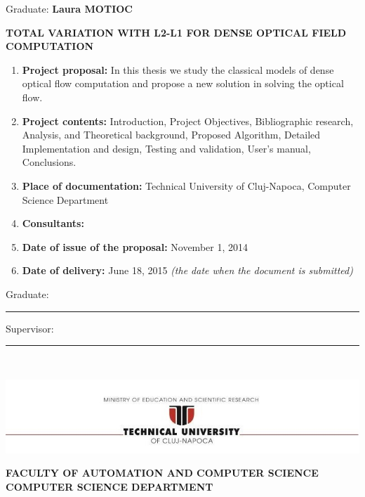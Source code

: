 \documentclass[12pt,a4paper,twoside]{report}
\renewcommand{\thesisauthor}{Laura MOTIOC}    %
\renewcommand{\thesistitle}{TOTAL VARIATION WITH L2-L1 FOR DENSE OPTICAL FIELD COMPUTATION}
\newcommand{\department}{\bf FACULTY OF AUTOMATION AND COMPUTER SCIENCE\\
COMPUTER SCIENCE DEPARTMENT}
\newcommand{\utcnlogo}{\includegraphics[width=15cm]{img/tucn.jpg}}
\newcommand{\uline}[1]{\rule[0pt]{#1}{0.4pt}}
\begin{document}
\vspace{2cm}

\begin{center}
Graduate: {\bf \thesisauthor}

\vspace{1cm}

{\bf \thesistitle}
\end{center}

\vspace{1cm}

\begin{enumerate}
 \item {\bf Project proposal:} In this thesis we study the classical models of dense optical flow computation and propose a new solution in solving the optical flow.
\item {\bf Project contents:} Introduction, Project Objectives, Bibliographic research, Analysis, and Theoretical background, Proposed Algorithm, Detailed Implementation and design,   Testing and validation, User's manual, Conclusions.
\item {\bf Place of documentation:} Technical University of Cluj-Napoca, Computer Science Department
\item {\bf Consultants:}
\item {\bf Date of issue of the proposal:} November 1, 2014
\item {\bf Date of  delivery:} June 18, 2015 {\it (the date when the document is submitted)}
  \end{enumerate}
\vspace{1.2cm}

\hspace{6cm} Graduate: \uline{6cm} 

\vspace{0.5cm}
\hspace{6cm} Supervisor: \uline{6cm} 

\thispagestyle{empty}


\newpage
$ $


\thispagestyle{empty}
\newpage

\begin{center}
\utcnlogo

\department
\end{center}

\vspace{0.5cm}
\end{document}
